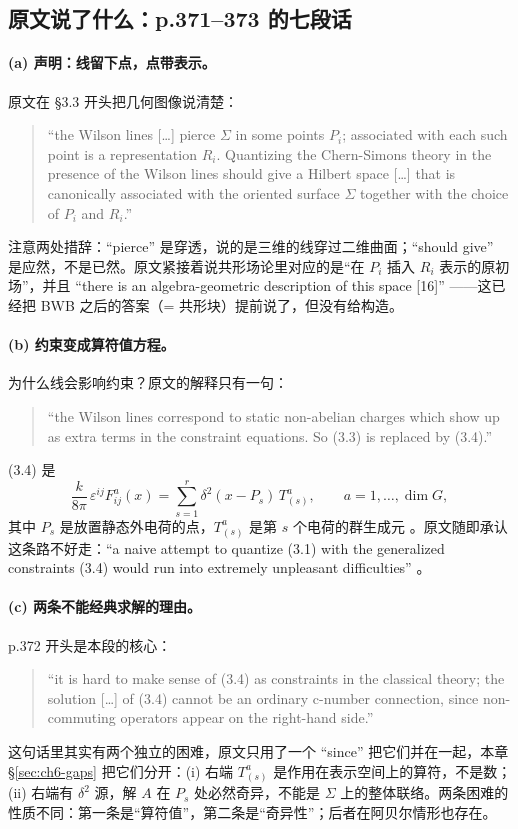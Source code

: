 \subsection{原文说了什么：p.371--373 的七段话}
\label{sec:ch6-quotes}

\paragraph{(a) 声明：线留下点，点带表示。}原文在 \S3.3 开头把几何图像说清楚：
\begin{quote}\small
“the Wilson lines [\dots] pierce $\Sigma$ in some points $P_i$; associated with each such point is a representation $R_i$. Quantizing the Chern-Simons theory in the presence of the Wilson lines should give a Hilbert space [\dots] that is canonically associated with the oriented surface $\Sigma$ together with the choice of $P_i$ and $R_i$.” 
\end{quote}
注意两处措辞：“pierce” 是穿透，说的是三维的线穿过二维曲面；“should give” 是应然，不是已然。原文紧接着说共形场论里对应的是“在 $P_i$ 插入 $R_i$ 表示的原初场”，并且 “there is an algebra-geometric description of this space [16]” ——这已经把 BWB 之后的答案（= 共形块）提前说了，但没有给构造。

\paragraph{(b) 约束变成算符值方程。}为什么线会影响约束？原文的解释只有一句：
\begin{quote}\small
“the Wilson lines correspond to static non-abelian charges which show up as extra terms in the constraint equations. So (3.3) is replaced by (3.4).” 
\end{quote}
(3.4) 是
\begin{equation}
\frac{k}{8\pi}\,\varepsilon^{ij}F^a_{ij}(x)
=\sum_{s=1}^{r}\delta^2(x-P_s)\,T^a_{(s)},
\qquad a=1,\dots,\dim G,
\label{eq:ch6-gauss}
\end{equation}
其中 $P_s$ 是放置静态外电荷的点，$T^a_{(s)}$ 是第 $s$ 个电荷的群生成元 。原文随即承认这条路不好走：“a naive attempt to quantize (3.1) with the generalized constraints (3.4) would run into extremely unpleasant difficulties” 。

\paragraph{(c) 两条不能经典求解的理由。}p.372 开头是本段的核心：
\begin{quote}\small
“it is hard to make sense of (3.4) as constraints in the classical theory; the solution [\dots] of (3.4) cannot be an ordinary c-number connection, since non-commuting operators appear on the right-hand side.” 
\end{quote}
这句话里其实有两个独立的困难，原文只用了一个 “since” 把它们并在一起，本章 \S\ref{sec:ch6-gaps} 把它们分开：(i) 右端 $T^a_{(s)}$ 是作用在表示空间上的算符，不是数；(ii) 右端有 $\delta^2$ 源，解 $A$ 在 $P_s$ 处必然奇异，不能是 $\Sigma$ 上的整体联络。两条困难的性质不同：第一条是“算符值”，第二条是“奇异性”；后者在阿贝尔情形也存在。

